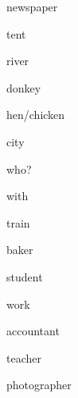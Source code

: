\begin{flashcard}{\LARGE newspaper}
\LARGE {}
\end{flashcard}
\begin{flashcard}{\LARGE tent}
\LARGE {}
\end{flashcard}
\begin{flashcard}{\LARGE river}
\LARGE {}
\end{flashcard}
\begin{flashcard}{\LARGE donkey}
\LARGE {}
\end{flashcard}
\begin{flashcard}{\LARGE hen/chicken}
\LARGE {}
\end{flashcard}
\begin{flashcard}{\LARGE city}
\LARGE {}
\end{flashcard}
\begin{flashcard}{\LARGE who?}
\LARGE {}
\end{flashcard}
\begin{flashcard}{\LARGE with}
\LARGE {}
\end{flashcard}
\begin{flashcard}{\LARGE train}
\LARGE {}
\end{flashcard}
\begin{flashcard}{\LARGE baker}
\LARGE {}
\end{flashcard}
\begin{flashcard}{\LARGE student}
\LARGE {}
\end{flashcard}
\begin{flashcard}{\LARGE work}
\LARGE {}
\end{flashcard}
\begin{flashcard}{\LARGE accountant}
\LARGE {}
\end{flashcard}
\begin{flashcard}{\LARGE teacher}
\LARGE {}
\end{flashcard}
\begin{flashcard}{\LARGE photographer}
\LARGE {}
\end{flashcard}
